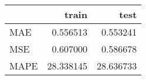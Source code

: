 \begin{tabular}{lrr}
\toprule
{} &      train &       test \\
\midrule
MAE  &   0.556513 &   0.553241 \\
MSE  &   0.607000 &   0.586678 \\
MAPE &  28.338145 &  28.636733 \\
\bottomrule
\end{tabular}
